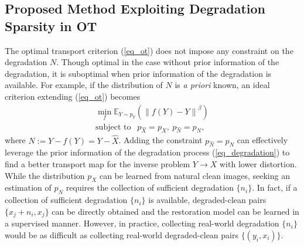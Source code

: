 \documentclass[10pt,journal,compsoc]{IEEEtran}
\begin{document}
\subsection{Proposed Method Exploiting Degradation Sparsity in OT}

The optimal transport criterion (\ref{eq_ot}) does not impose any
constraint on the degradation $N$. Though optimal in the case without prior information of the degradation, it is suboptimal when
prior information of the degradation is available. For example,
if the distribution of $N$ is \textit{a priori} known, an ideal
criterion extending (\ref{eq_ot}) becomes
\begin{equation}
\begin{gathered}
  \mathop {\min }\limits_f {\mathbb{E}_{Y \sim {p_Y}}}\left(\left\|f(Y)-Y\right\|^\beta\right) \\
  {\text{subject \ to \ }}~~{p_{\hat X}} = {p_X},~{p_{\hat N}} = {p_N},
\end{gathered}
\label{eq_ot_knowPn}
\end{equation}
where $N:=Y-f(Y)=Y-\hat{X}$. Adding the constraint ${p_{\hat N}} = {p_N}$
can effectively leverage the prior information of the degradation process (\ref{eq_degradation})
to find a better transport map for the inverse problem $Y\rightarrow X$ with
lower distortion. While the distribution $p_X$ can be learned from natural
clean images, seeking an estimation of $p_N$ requires the collection of
sufficient degradation $\{n_i\}$. In fact, if a collection of sufficient
degradation $\{n_i\}$ is available, degraded-clean pairs $\{x_j+n_i,x_j\}$
can be directly obtained and the restoration model can be learned in a
supervised manner. However, in practice, collecting real-world degradation
$\{n_i\}$ would be as difficult as collecting real-world degraded-clean pairs $\{(y_i,x_i)\}$.
\end{document}
